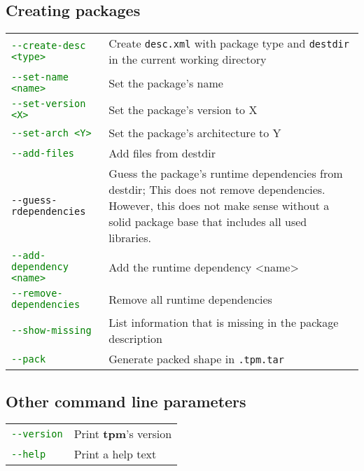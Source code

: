 \documentclass[a4paper]{article}
\newcommand{\file}[1]{\texttt{#1}}
\newcommand{\program}[1]{\textbf{#1}}
\newcommand{\green}[1]{\textcolor{green}{#1}}
\begin{document}
	\subsection{Creating packages}
	\label{sec:creating_packages}
	
	\bgroup
	\def\arraystretch{1.5}
	\begin{tabularx}{\textwidth}{lX}
		\green{\texttt{-{}-create-desc <type>}} & Create \file{desc.xml} with package type and \file{destdir} in the current working directory \\
		
		\green{\texttt{-{}-set-name <name>}} & Set the package's name \\
		
		\green{\texttt{-{}-set-version <X>}} & Set the package's version to X \\
		
		\green{\texttt{-{}-set-arch <Y>}} & Set the package's architecture to Y \\
		
		\green{\texttt{-{}-add-files}} & Add files from destdir \\
		
		\texttt{-{}-guess-rdependencies} & Guess the package's runtime dependencies from destdir; This does not remove dependencies. However, this does not make sense without a solid package base that includes all used libraries. \\
		
		\green{\texttt{-{}-add-dependency <name>}} & Add the runtime dependency <name> \\
		
		\green{\texttt{-{}-remove-dependencies}} & Remove all runtime dependencies \\
		
		\green{\texttt{-{}-show-missing}} & List information that is missing in the package description \\
		
		\green{\texttt{-{}-pack}} & Generate packed shape in \texttt{.tpm.tar}
	\end{tabularx}
	\egroup

	\subsection{Other command line parameters}
	\label{sec:other_command_line_parameters}
	
	\bgroup
	\def\arraystretch{1.5}
	\begin{tabularx}{\textwidth}{lX}
		\green{\texttt{-{}-version}} & Print \program{tpm}'s version \\
		\green{\texttt{-{}-help}} & Print a help text
	\end{tabularx}
	\egroup
	
\end{document}
